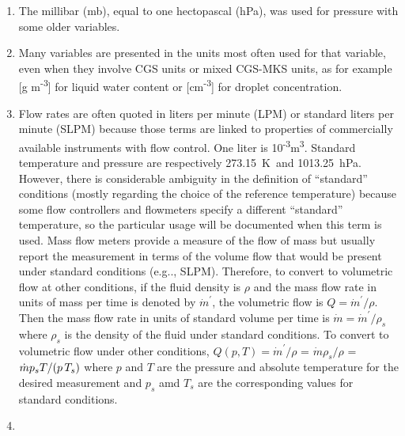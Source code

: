 \documentclass[
]{book}
\providecommand{\tightlist}{%
  \setlength{\itemsep}{0pt}\setlength{\parskip}{0pt}}
\begin{document}
\begin{enumerate}
\def\labelenumi{\arabic{enumi}.}
\tightlist
\item
  The millibar (mb), equal to one hectopascal (hPa), was used for pressure with some older variables.\\
\item
  Many variables are presented in the units most often used for that variable, even when they involve CGS units or mixed CGS-MKS units, as for example {[}g m\textsuperscript{-3}{]} for liquid water content or
  {[}cm\textsuperscript{-3}{]} for droplet concentration.\\
\item
  Flow rates are often quoted in liters per minute (LPM) or standard liters per minute (SLPM) because those terms are linked to properties of commercially available instruments with flow control. One liter is 10\textsuperscript{-3}m\textsuperscript{3}. Standard temperature and pressure are respectively 273.15~K~and 1013.25~hPa. However, there is considerable ambiguity in the definition of ``standard'' conditions (mostly regarding the choice of the reference temperature) because some flow controllers and flowmeters specify a different ``standard'' temperature, so the particular usage will be documented when this term is used. Mass flow meters provide a measure of the flow of mass but usually report the measurement in terms of the volume flow that would be present under standard conditions (e.g.., SLPM). Therefore, to convert to volumetric flow at other conditions, if the fluid density is \(\rho\) and the mass flow rate in units of mass per time is denoted by \(\dot{m}^\prime\), the volumetric flow is \(Q=\dot{m}^\prime/\rho\). Then the mass flow rate in units of standard volume per time is \(\dot{m}=\dot{m}^\prime/\rho_s\) where \(\rho_s\) is the density of the fluid under standard conditions. To convert to volumetric flow under other conditions, \(Q(p,T)=\dot{m}^\prime/\rho\) = \(\dot{m}\rho_s/\rho\) = \(\dot{m}p_{s}T/(p\thinspace T_{s})\) where \(p\) and \(T\) are the pressure and absolute temperature for the desired measurement and \(p_s\) amd \(T_s\) are the corresponding values for standard conditions.\\
\item

\end{enumerate}
\end{document}
